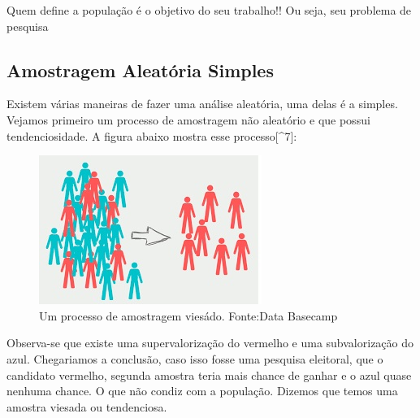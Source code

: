 \documentclass[
  letterpaper,
  DIV=11,
  numbers=noendperiod]{scrreprt}
\begin{document}
\begin{tcolorbox}[enhanced jigsaw, leftrule=.75mm, coltitle=black, colframe=quarto-callout-tip-color-frame, toprule=.15mm, opacitybacktitle=0.6, bottomtitle=1mm, bottomrule=.15mm, titlerule=0mm, toptitle=1mm, title=\textcolor{quarto-callout-tip-color}{\faLightbulb}\hspace{0.5em}{População}, arc=.35mm, breakable, opacityback=0, colbacktitle=quarto-callout-tip-color!10!white, colback=white, left=2mm, rightrule=.15mm]

Quem define a população é o objetivo do seu trabalho!! Ou seja, seu
problema de pesquisa

\end{tcolorbox}

\subsection{Amostragem Aleatória
Simples}\label{amostragem-aleatuxf3ria-simples}

Existem várias maneiras de fazer uma análise aleatória, uma delas é a
simples. Vejamos primeiro um processo de amostragem não aleatório e que
possui tendenciosidade. A figura abaixo mostra esse processo{[}\^{}7{]}:

\begin{figure}[H]

{\centering \includegraphics[width=0.5\linewidth,height=\textheight,keepaspectratio]{figuras/bias.jpg}

}

\caption{Um processo de amostragem viesádo. Fonte:Data Basecamp}

\end{figure}%

Observa-se que existe uma supervalorização do vermelho e uma
subvalorização do azul. Chegariamos a conclusão, caso isso fosse uma
pesquisa eleitoral, que o candidato vermelho, segunda amostra teria mais
chance de ganhar e o azul quase nenhuma chance. O que não condiz com a
população. Dizemos que temos uma amostra viesada ou tendenciosa.
\end{document}
